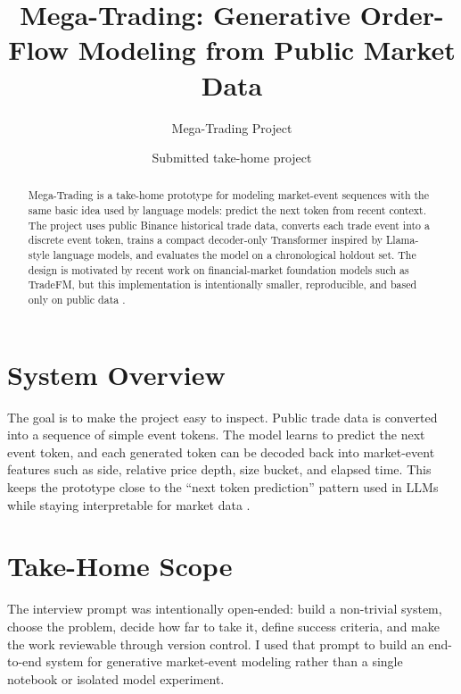 \documentclass[11pt]{article}
\title{\textbf{Mega-Trading: Generative Order-Flow Modeling from Public Market Data}}
\author{Mega-Trading Project}
\date{Submitted take-home project}
\begin{document}
\maketitle

\begin{abstract}
Mega-Trading is a take-home prototype for modeling market-event sequences with
the same basic idea used by language models: predict the next token from recent
context. The project uses public Binance historical trade data, converts each
trade event into a discrete event token, trains a compact decoder-only
Transformer inspired by Llama-style language models, and evaluates the model on
a chronological holdout set. The design is motivated by recent work on
financial-market foundation models such as TradeFM, but this implementation is
intentionally smaller, reproducible, and based only on public data
\cite{binancepublic,tradefm,llama3,bommasani2021foundation}.
\end{abstract}

\section{System Overview}

The goal is to make the project easy to inspect. Public trade data is converted
into a sequence of simple event tokens. The model learns to predict the next
event token, and each generated token can be decoded back into market-event
features such as side, relative price depth, size bucket, and elapsed time. This
keeps the prototype close to the ``next token prediction'' pattern used in LLMs
while staying interpretable for market data \cite{vaswani2017attention,llama3}.

\section{Take-Home Scope}

The interview prompt was intentionally open-ended: build a non-trivial system,
choose the problem, decide how far to take it, define success criteria, and make
the work reviewable through version control. I used that prompt to build an
end-to-end system for generative market-event modeling rather than a single
notebook or isolated model experiment.
\end{document}

